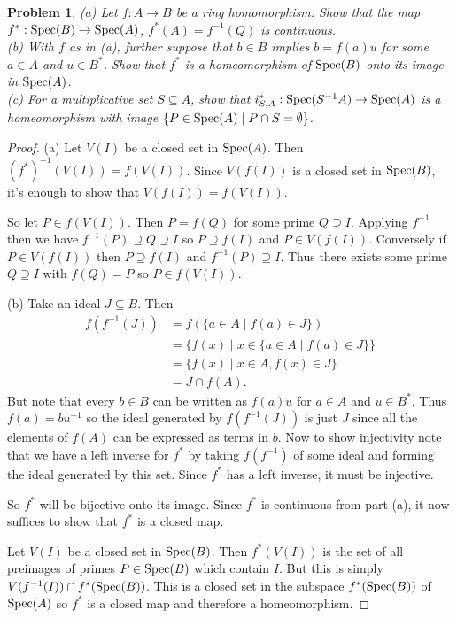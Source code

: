 \documentclass{article}
\newcommand{\spec}{\textup{Spec}}
\newtheorem{problem}{Problem}
\begin{document}
\begin{problem}
(a) Let $f : A \to B$ be a ring homomorphism. Show that the map $f^* : \spec(B) \to \spec(A)$, $f^*(A) = f^{-1}(Q)$ is continuous.\\
(b) With $f$ as in (a), further suppose that $b \in B$ implies $b = f(a)u$ for some $a \in A$ and $u \in B^*$. Show that $f^*$ is a homeomorphism of $\spec(B)$ onto its image in $\spec(A)$.\\
(c) For a multiplicative set $S \subseteq A$, show that $i_{S,A}^* : \spec(S^{-1}A) \to \spec(A)$ is a homeomorphism with image $\{P \in \spec(A) \mid P \cap S = \emptyset \}$.
\end{problem}
\begin{proof}
(a) Let $V(I)$ be a closed set in $\spec(A)$. Then $(f^*)^{-1}(V(I)) = f(V(I))$. Since $V(f(I))$ is a closed set in $\spec(B)$, it's enough to show that $V(f(I)) = f(V(I))$.

So let $P \in f(V(I))$. Then $P = f(Q)$ for some prime $Q \supseteq I$. Applying $f^{-1}$ then we have $f^{-1}(P) \supseteq Q \supseteq I$ so $P \supseteq f(I)$ and $P \in V(f(I))$. Conversely if $P \in V(f(I))$ then $P \supseteq f(I)$ and $f^{-1}(P) \supseteq I$. Thus there exists some prime $Q \supseteq I$ with $f(Q) = P$ so $P \in f(V(I))$.

(b) Take an ideal $J \subseteq B$. Then
\begin{align*}
f(f^{-1}(J))
&= f(\{a \in A \mid f(a) \in J\})\\
&= \{f(x) \mid x \in \{a \in A \mid f(a) \in J\}\}\\
&= \{f(x) \mid x \in A, f(x) \in J\}\\
&= J \cap f(A).
\end{align*}
But note that every $b \in B$ can be written as $f(a)u$ for $a \in A$ and $u \in B^*$. Thus $f(a) = bu^{-1}$ so the ideal generated by $f(f^{-1}(J))$ is just $J$ since all the elements of $f(A)$ can be expressed as terms in $b$. Now to show injectivity note that we have a left inverse for $f^*$ by taking $f(f^{-1})$ of some ideal and forming the ideal generated by this set. Since $f^*$ has a left inverse, it must be injective.

So $f^*$ will be bijective onto its image. Since $f^*$ is continuous from part (a), it now suffices to show that $f^*$ is a closed map.

Let $V(I)$ be a closed set in $\spec(B)$. Then $f^*(V(I))$ is the set of all preimages of primes $P \in \spec(B)$ which contain $I$. But this is simply $V(f^{-1}(I)) \cap f^*(\spec(B))$. This is a closed set in the subspace $f^*(\spec(B))$ of $\spec(A)$ so $f^*$ is a closed map and therefore a homeomorphism.


\end{proof}
\end{document}
